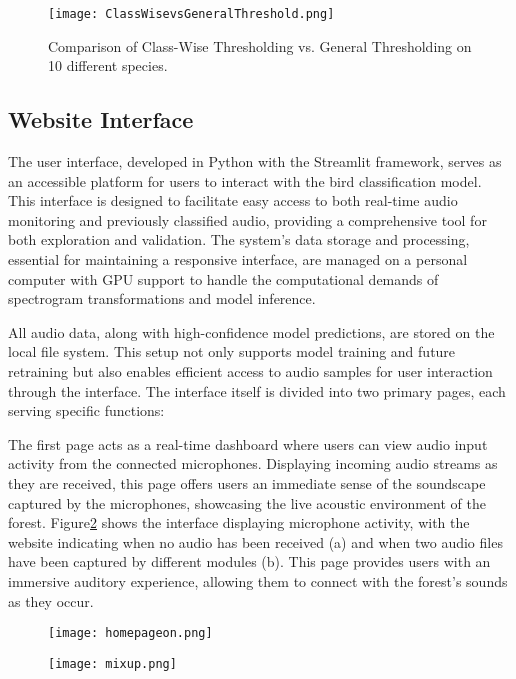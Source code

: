 \begin{figure}[h]
    \centering
    \texttt{[image: ClassWisevsGeneralThreshold.png]}
    \caption{Comparison of Class-Wise Thresholding vs. General Thresholding on 10 different species.}
    \vspace{0.1cm}
    \label{fig:vsclass}
\end{figure}

\subsection{Website Interface}

The user interface, developed in Python with the Streamlit framework, serves as an accessible platform for users to interact with the bird classification model. This interface is designed to facilitate easy access to both real-time audio monitoring and previously classified audio, providing a comprehensive tool for both exploration and validation. The system’s data storage and processing, essential for maintaining a responsive interface, are managed on a personal computer with GPU support to handle the computational demands of spectrogram transformations and model inference.

All audio data, along with high-confidence model predictions, are stored on the local file system. This setup not only supports model training and future retraining but also enables efficient access to audio samples for user interaction through the interface. The interface itself is divided into two primary pages, each serving specific functions:

The first page acts as a real-time dashboard where users can view audio input activity from the connected microphones. Displaying incoming audio streams as they are received, this page offers users an immediate sense of the soundscape captured by the microphones, showcasing the live acoustic environment of the forest. Figure\ref{fig:website} shows the interface displaying microphone activity, with the website indicating when no audio has been received (a) and when two audio files have been captured by different modules (b). This page provides users with an immersive auditory experience, allowing them to connect with the forest’s sounds as they occur.

\begin{figure}[h!]
    \centering
    \begin{minipage}{.5\textwidth}
        \centering
        \texttt{[image: homepageon.png]}
    \end{minipage}%
    \begin{minipage}{.5\textwidth}
        \centering
        \texttt{[image: mixup.png]}
    \end{minipage}
    \caption{}
    \label{fig:website}
\end{figure}


